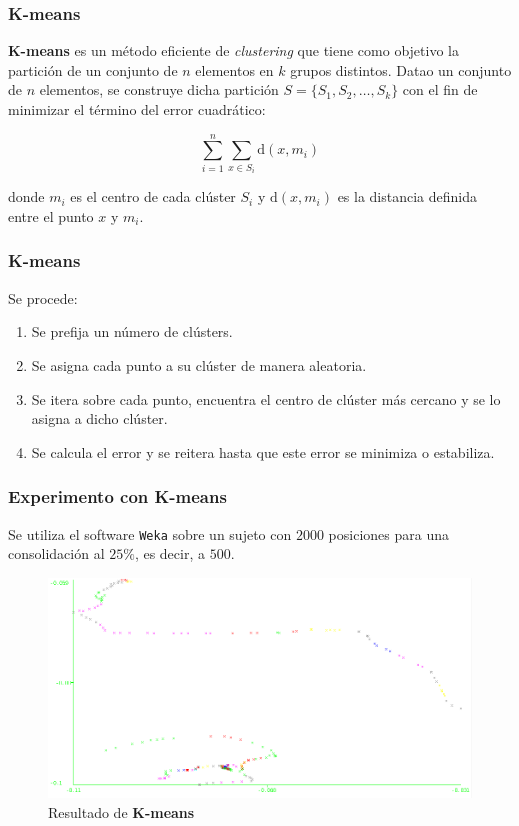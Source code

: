 \documentclass[10pt, spanish]{beamer}
\begin{document}
\begin{frame}[fragile]
\frametitle{K-means}
\textbf{K-means} es un m\'etodo eficiente de \textit{clustering} que tiene como objetivo la partici\'on de un conjunto de $n$ elementos en $k$ grupos distintos. Datao un conjunto de $n$ elementos, se construye dicha partici\'on $S=\{S_1, S_2, \ldots, S_k\}$ con el fin de minimizar el t\'ermino del error cuadr\'atico:

$$ \sum_{i=1}^{n} \sum_{x\in S_i} \text{d}(x,m_i)$$

donde $m_i$ es el centro de cada cl\'uster $S_i$ y $\text{d}(x, m_i)$ es la distancia definida entre el punto $x$ y $m_i$.

\end{frame}

\begin{frame}[fragile]
\frametitle{K-means}
Se procede:
\begin{enumerate}
	\item Se prefija un n\'umero de cl\'usters.
	\item Se asigna cada punto a su cl\'uster de manera aleatoria.
	\item Se itera sobre cada punto, encuentra el centro de cl\'uster m\'as cercano y se lo asigna a dicho cl\'uster.
	\item Se calcula el error y se reitera hasta que este error se minimiza o estabiliza.
\end{enumerate}
\end{frame}

\begin{frame}[fragile]
\frametitle{Experimento con K-means}
Se utiliza el software \texttt{Weka} sobre un sujeto con $2000$ posiciones para una consolidaci\'on al $25\%$, es decir, a $500$.

\begin{figure}[H]
	\includegraphics[scale=.35]{kMeansSujeto1.png}
	\caption{Resultado de \textbf{K-means}}
\end{figure}


\end{frame}
\end{document}
